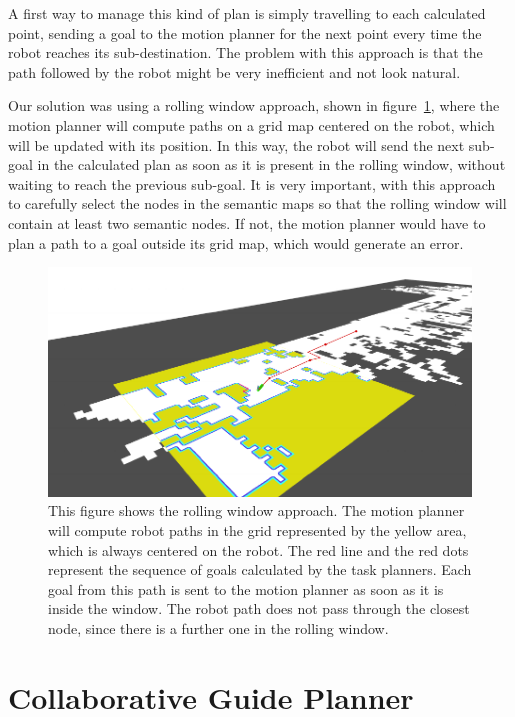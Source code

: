 A first way to manage this kind of plan is simply travelling to each calculated point, sending a goal to the motion planner for the next point every time the robot reaches its sub-destination. The problem with this approach is that the path followed by the robot might be very inefficient and not look natural.

Our solution was using a rolling window approach, shown in figure~\ref{fig:spencer-rolling_window}, where the motion planner will compute paths on a grid map centered on the robot, which will be updated with its position. In this way, the robot will send the next sub-goal in the calculated plan as soon as it is present in the rolling window, without waiting to reach the previous sub-goal. It is very important, with this approach to carefully select the nodes in the semantic maps so that the rolling window will contain at least two semantic nodes. If not, the motion planner would have to plan a path to a goal outside its grid map, which would generate an error.


\begin{figure}[ht!]
	\centering
	\includegraphics[]{img/case_study/spencer/rolling_window.pdf}
	\caption[Rolling window]{This figure shows the rolling window approach. The motion planner will compute robot paths in the grid represented by the yellow area, which is always centered on the robot. The red line and the red dots represent the sequence of goals calculated by the task planners. Each goal from this path is sent to the motion planner as soon as it is inside the window. The robot path does not pass through the closest node, since there is a further one in the rolling window.}
	\label{fig:spencer-rolling_window}
\end{figure}

\section{Collaborative Guide Planner }
\label{sec:spencer-collaborative_guide_planner}

